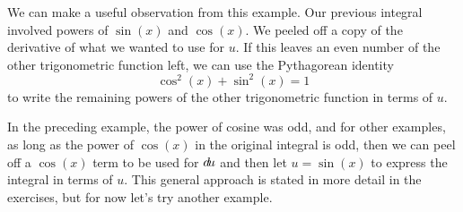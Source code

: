 \documentclass{ximera}
\begin{document}
We can make a useful observation from this example. Our previous integral involved powers of $\sin(x)$ and $\cos(x)$. We peeled off a copy of the derivative of what we wanted to use for $u$.  If this leaves an even number of the other trigonometric function left, we can use the Pythagorean identity \[\cos^{2}(x)+ \sin^{2}(x) =1\] to write the remaining powers of the other trigonometric function in terms of $u$.  

In the preceding example, the power of cosine was odd, and for other examples, as long as the power of $\cos(x)$ in the original integral is odd, then we can peel off a $\cos(x)$ term to be used for $\mathop{}\!d\! u$ and then let $u=\sin(x)$ to express the integral in terms of $u$.  This general approach is stated in more detail in the exercises, but for now let's try another example.


%
%
\end{document}
